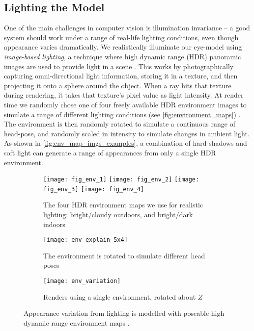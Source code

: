 \subsection{Lighting the Model}

One of the main challenges in computer vision is illumination invariance -- a good system should work under a range of real-life lighting conditions, even though appearance varies dramatically.
We realistically illuminate our eye-model using \emph{image-based lighting}, a technique where high dynamic range (HDR) panoramic images are used to provide light in a scene \cite{debevec2002image}.
This works by photographically capturing omni-directional light information, storing it in a texture, and then projecting it onto a sphere around the object.
When a ray hits that texture during rendering, it takes that texture's pixel value as light intensity.
At render time we randomly chose one of four freely available HDR environment images to simulate a range of different lighting conditions (see \autoref{fig:environment_maps}) \cite{AdaptiveSamplesHDR}.
The environment is then randomly rotated to simulate a continuous range of head-pose, and randomly scaled in intensity to simulate changes in ambient light.
As shown in \autoref{fig:env_map_imgs_examples}, a combination of hard shadows and soft light can generate a range of appearances from only a single HDR environment.

\begin{figure}

    \begin{subfigure}[t]{\columnwidth}
        \texttt{[image: fig\_env\_1]} \hfill
    	\texttt{[image: fig\_env\_2]} \hfill
        \texttt{[image: fig\_env\_3]} \hfill
    	\texttt{[image: fig\_env\_4]}
	    \caption{The four HDR environment maps we use for realistic lighting: bright/cloudy outdoors, and bright/dark indoors}
    \end{subfigure}
    \par \medskip
    \begin{subfigure}[t]{0.48\columnwidth}
        \texttt{[image: env\_explain\_5x4]}
    	\caption{The environment is rotated to simulate different head poses}
    \end{subfigure}%
    \hfill
    \begin{subfigure}[t]{0.48\columnwidth}
        \texttt{[image: env\_variation]}
        \caption{Renders using a single environment, rotated about $Z$}
        \label{fig:env_map_imgs_examples}
    \end{subfigure}
    \caption{Appearance variation from lighting is modelled with poseable high dynamic range environment maps \cite{debevec2002image}.}
    \label{fig:environment_maps}
\end{figure}

